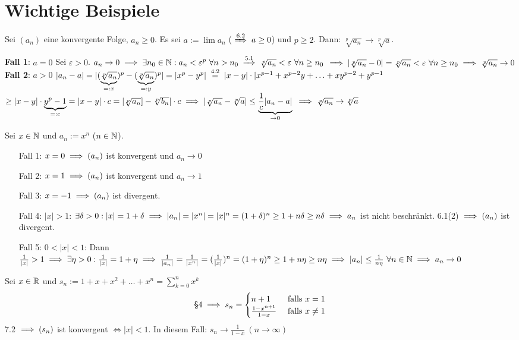 \documentclass[a4paper,twoside,DIV15,BCOR12mm]{scrbook}
\begin{document}
\chapter{Wichtige Beispiele}

\begin{satz}
Sei $(a_n)$ eine konvergente Folge, $a_n\ge0$. Es sei $a := \lim a_n$ ($\displaystyle\folgtnach{6.2} a \ge 0$) und $p \ge 2$. Dann: $\sqrt[p]{a_n} \to \sqrt[p]{a}$.
\end{satz}

\begin{beweis}
\textbf{Fall 1}: $a=0$ Sei $\varepsilon >0$.
$a_n\to0 \folgt \exists n_0 \in \MdN: a_n < \varepsilon^p \ \forall n >n_0 \folgtnach{5.1} \sqrt[p]{a_n} < \varepsilon \ \forall n \ge n_0 $
$\implies |\sqrt[p]{a_n} - 0| = \sqrt[p]{a_n} < \varepsilon \ \forall n \ge n_0 \implies \sqrt[p]{a_n} \to 0$\\
\textbf{Fall 2}: $a>0$
$ |a_n - a| = |(\underbrace{\sqrt[p]{a_n}}_{=: x})^p - (\underbrace{\sqrt[p]{a_n}}_{=: y})^p| = |x^p - y^p| \gleichnach{4.2} |x - y| \cdot |x^{p-1} + x^{p-2}y + \ldots + xy^{p-2} + y^{p-1}$
$\ge |x-y| \cdot \underbrace{y^p-1}_{=: c} = |x-y|\cdot c = |\sqrt[p]{a_n}] - \sqrt[p]{b_n}|\cdot c \implies |\sqrt[p]{a_n} - \sqrt[p]{a}| \le \underbrace{\frac{1}{c}|a_n-a|}_{\to 0} $
$ \implies \sqrt[p]{a_n} \to \sqrt[p]{a} $
\end{beweis}

\begin{wichtigesbeispiel}
Sei $x\in\mathbb{N}$ und $a_n := x^n$ ($n\in\mathbb{N}$).
\begin{itemize}
\item[Fall 1:] $x=0 \implies (a_n)$ ist konvergent und $a_n \to 0$
\item[Fall 2:] $x=1 \implies (a_n)$ ist konvergent und $a_n \to 1$
\item[Fall 3:] $x=-1 \implies (a_n)$ ist divergent.
\item[Fall 4:] $|x| > 1$: $\exists \delta > 0 : |x| = 1+\delta \implies |a_n| = |x^n| = |x|^n = (1+\delta)^n \ge 1+n\delta \ge n\delta \implies a_n$ ist nicht beschränkt. 6.1(2) $\implies (a_n)$ ist divergent.
\item[Fall 5:] $0 <|x|<1$: Dann $\frac{1}{|x|} > 1 \implies \exists \eta>0: \frac{1}{|x|} = 1+\eta \implies \frac{1}{|a_n|} = \frac{1}{|x^n|} = (\frac{1}{|x|})^n = (1+\eta)^n \ge 1+n\eta \ge n\eta \implies |a_n| \le \frac{1}{n\eta} \ \forall n\in\mathbb{N} \implies a_n \to 0$
\end{itemize}
\end{wichtigesbeispiel}
\begin{wichtigesbeispiel}
\item Sei $x\in\mathbb{R}$ und $s_n := 1+x+x^2+\ldots+x^n=\displaystyle\sum_{k=0}^n x^k$
$$ \text{§4} \implies s_n=\begin{cases}n+1 & \text{ falls }x=1 \\ \frac{1-x^{n+1}}{1-x} & \text{ falls }x\ne 1\end{cases} $$
7.2 $\implies (s_n)$ ist konvergent $\iff |x| < 1$. In diesem Fall: $s_n \to \frac{1}{1-x}\ (n \to \infty)$
\end{wichtigesbeispiel}
\end{document}
